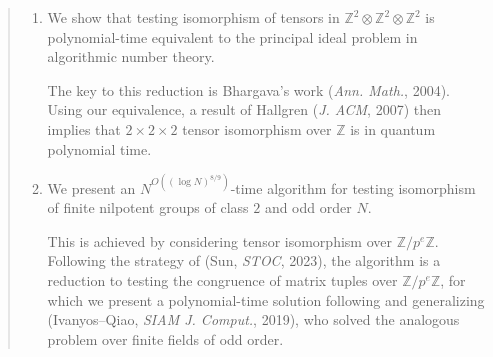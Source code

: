 \documentclass[11pt]{article}
\begin{document}
\begin{abstract}
\begin{enumerate}
		
\item We show that testing isomorphism of tensors in $\mathbb{Z}^2\otimes\mathbb{Z}^2\otimes\mathbb{Z}^2$ is polynomial-time equivalent to the principal ideal problem in algorithmic number theory. 
		
The key to this reduction is Bhargava's work (\emph{Ann. Math.}, 2004). Using our equivalence, a result of Hallgren (\emph{J. ACM}, 2007) then implies that $2\times 2\times 2$ tensor isomorphism over $\mathbb{Z}$ is in quantum polynomial time.
		
\item We present an $N^{O((\log N)^{8/9})}$-time algorithm for testing isomorphism of finite nilpotent groups of class $2$ and odd order $N$. 
		
This is achieved by considering tensor isomorphism over $\mathbb{Z}/p^e\mathbb{Z}$. Following the strategy of (Sun, \emph{STOC}, 2023), the algorithm is a reduction to testing the congruence of matrix tuples over $\mathbb{Z}/p^e\mathbb{Z}$, for which we present a polynomial-time solution following and generalizing (Ivanyos--Qiao, \emph{SIAM J. Comput.}, 2019), who solved the analogous problem over finite fields of odd order.
		
\end{enumerate}
\end{abstract}

\newpage

\setcounter{tocdepth}{2}

\tableofcontents


\newpage
{}     %





%








\appendix








\end{document}
